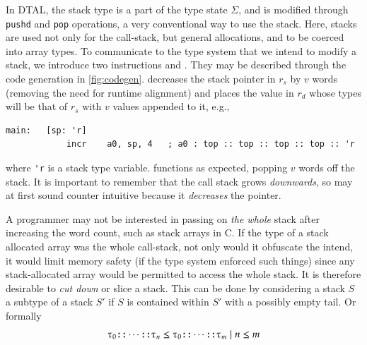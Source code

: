In DTAL, the stack type is a part of the type state $\Sigma$, and is modified
through \texttt{pushd} and \texttt{pop} operations, a very conventional way to
use the stack.
Here, stacks are used not only for the call-stack, but general allocations, and
to be coerced into array types.
To communicate to the type system that we intend to modify a stack, we
introduce two instructions \incr and \decr. They may be described through the
code generation in \ref{fig:codegen}. \incr decreases the stack pointer in
$r_s$ by $v$ words (removing the need for runtime alignment) and places the
value in $r_d$ whose types will be that of $r_s$ with $v$ \ttop values
appended to it, e.g.,
\begin{lstlisting}[gobble=4]
    main:   [sp: 'r]
            incr    a0, sp, 4   ; a0 : top :: top :: top :: top :: 'r
\end{lstlisting}
where \lstinline{'r} is a stack type variable.
\decr functions as expected, popping $v$ words off the stack.
It is important to remember that the call stack grows \emph{downwards}, so \incr
may at first sound counter intuitive because it \emph{decreases} the pointer.

A programmer may not be interested in passing on \emph{the whole} stack after
increasing the word count, such as stack arrays in C. If the type of a stack
allocated array was the whole call-stack, not only would it obfuscate the
intend, it would limit memory safety (if the type system enforced such
things) since any stack-allocated array would be permitted to access the whole
stack.
It is therefore desirable to \emph{cut down} or slice a stack. This can be done
by considering a stack $S$ a subtype of a stack $S'$ if $S$ is contained within
$S'$ with a possibly empty tail. Or formally
\begin{equation*}
    \tau_0 \texttt{::} \cdots \texttt{::} \tau_n
    \leq
    \tau_0 \texttt{::} \cdots \texttt{::} \tau_m
    \mid
    n \leq m
\end{equation*}




